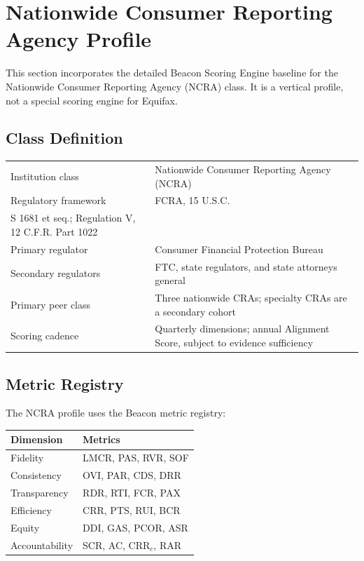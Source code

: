 \section{Nationwide Consumer Reporting Agency Profile}

This section incorporates the detailed Beacon Scoring Engine baseline for the
Nationwide Consumer Reporting Agency (NCRA) class. It is a vertical profile,
not a special scoring engine for Equifax.

\subsection{Class Definition}

\begin{center}
\begin{tabular}{p{4cm}p{10cm}}
\toprule
Institution class & Nationwide Consumer Reporting Agency (NCRA) \\
Regulatory framework & FCRA, 15 U.S.C. \\S 1681 et seq.; Regulation V, 12 C.F.R. Part 1022 \\
Primary regulator & Consumer Financial Protection Bureau \\
Secondary regulators & FTC, state regulators, and state attorneys general \\
Primary peer class & Three nationwide CRAs; specialty CRAs are a secondary cohort \\
Scoring cadence & Quarterly dimensions; annual Alignment Score, subject to evidence sufficiency \\
\bottomrule
\end{tabular}
\end{center}

\subsection{Metric Registry}

The NCRA profile uses the Beacon metric registry:

\begin{center}
\begin{tabular}{p{3cm}p{9.8cm}}
\toprule
Dimension & Metrics \\
\midrule
Fidelity & LMCR, PAS, RVR, SOF \\
Consistency & OVI, PAR, CDS, DRR \\
Transparency & RDR, RTI, FCR, PAX \\
Efficiency & CRR, PTS, RUI, BCR \\
Equity & DDI, GAS, PCOR, ASR \\
Accountability & SCR, AC, CRR$_c$, RAR \\
\bottomrule
\end{tabular}
\end{center}

